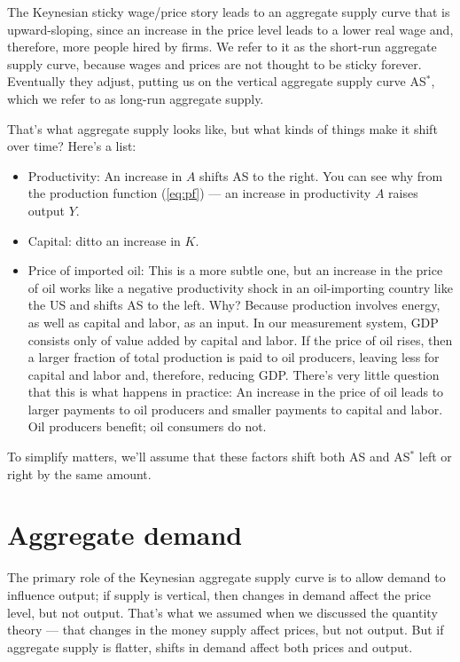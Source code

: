 The Keynesian sticky wage/price story leads to
an aggregate supply curve that is upward-sloping,
since an increase in the price level leads to a lower
real wage and, therefore, more people hired by firms.
We refer to it as the short-run aggregate supply curve,
because wages and prices are not thought to be sticky forever.
Eventually they adjust, putting us on the vertical aggregate
supply curve AS$^*$,
which we refer to as long-run aggregate supply.


That's what aggregate supply looks like,
but what kinds of things make it shift over time?
Here's a list:
%
\begin{itemize}
\item Productivity:  An increase in $A$ shifts AS to the right.
You can see why from the production function (\ref{eq:pf}) --- an increase in productivity $A$ raises output $Y$.


\item Capital:  ditto an increase in $K$.
\item Price of imported oil:  This is a more subtle one, but
an increase in the price of oil works like a negative productivity shock
in an oil-importing country like the US and shifts AS to the left.
Why?  Because production involves energy, as well as capital and labor, as an input.
In our measurement system, GDP consists only of value added by capital
and labor.
If the price of oil rises, then a larger fraction of total production
is paid to oil producers, leaving less for capital and labor and, therefore, reducing GDP.
There's very little question that this is what happens in practice: An increase in the price of oil leads to larger payments to oil producers
and smaller payments to capital and labor.
Oil producers benefit; oil consumers do not.
\end{itemize}
%
To simplify matters, we'll assume that these factors shift both AS and AS$^*$
left or right by the same amount.


\section{Aggregate demand}


The primary role of the Keynesian aggregate supply curve is to
allow demand to influence output;
if supply is vertical, then changes in demand affect the price level,
but not output.
That's what we assumed when we discussed the quantity theory --- that changes in the money supply affect prices, but not output.
But if aggregate supply is flatter,
shifts in demand affect both prices and output.

